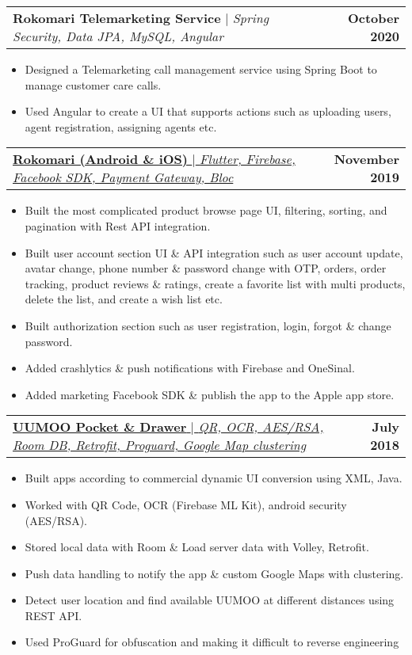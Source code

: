 \documentclass[letterpaper,11pt]{article}
\makeatletter
\newcommand{\resumeItem}[1]{
  \item\small{
    {#1 \vspace{-2pt}}
  }
}
\newcommand{\resumeProjectHeading}[2]{
    \item
    \begin{tabular*}{1.001\textwidth}{l@{\extracolsep{\fill}}r}
      \small#1 & \textbf{\small #2}\\
    \end{tabular*}\vspace{-7pt}
}
\newcommand{\resumeItemListStart}{\begin{itemize}}
\newcommand{\resumeItemListEnd}{\end{itemize}\vspace{-5pt}}
\makeatother
\begin{document}
          \resumeProjectHeading
          {\textbf{Rokomari Telemarketing Service} $|$ \emph{Spring Security, Data JPA, MySQL, Angular}}{October 2020}
          \resumeItemListStart
            \resumeItem{Designed a Telemarketing call management service using Spring Boot to manage customer care calls.}
            \resumeItem{Used Angular to create a UI that supports actions such as uploading users, agent registration, assigning agents etc.}
          \resumeItemListEnd 
           \vspace{-13pt}

           \resumeProjectHeading
          {\href{https://apps.apple.com/us/app/rokomari-trusted-online-store/id1493045502}{\textbf{Rokomari (Android \& iOS)} $|$ \emph{Flutter, Firebase, Facebook SDK, Payment Gateway, Bloc}}}{November 2019}
          \resumeItemListStart
            \resumeItem{Built the most complicated product browse page UI, filtering, sorting, and pagination with Rest API integration.}
            \resumeItem{Built user account section UI \& API integration such as user account update, avatar change, phone number \& password change with OTP, orders, order tracking, product reviews \& ratings, create a favorite list with multi products, delete the list, and create a wish list etc.}
            \resumeItem{Built authorization section such as user registration, login, forgot \& change password.}
            \resumeItem{Added crashlytics \& push notifications with Firebase and OneSinal.}
            \resumeItem{Added marketing Facebook SDK \& publish the app to the Apple app store.}
          \resumeItemListEnd 
           \vspace{-13pt}
        
           
          \resumeProjectHeading
          {\href{https://drive.google.com/file/d/1UmFqvvCmJASvv_Hj4EYwOrWUpg7c4M52/preview}{\textbf{UUMOO Pocket \& Drawer} $|$ \emph{QR, OCR, AES/RSA, Room DB, Retrofit, Proguard, Google Map clustering}}}{July 2018}
          \resumeItemListStart
            \resumeItem{Built apps according to commercial dynamic UI conversion using XML, Java.}
            \resumeItem {Worked with QR Code, OCR (Firebase ML Kit), android security (AES/RSA).}
            \resumeItem {Stored local data with Room \& Load server data with Volley, Retrofit.}
            \resumeItem {Push data handling to notify the app \& custom Google Maps with clustering.}
            \resumeItem {Detect user location and find available UUMOO at different distances using REST API.}
            \resumeItem {Used ProGuard for obfuscation and making it difficult to reverse engineering}
          \resumeItemListEnd 
          \vspace{-13pt}
          
\end{document}
